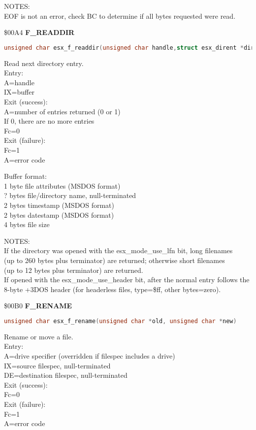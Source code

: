 NOTES:\\
EOF is not an error, check BC to determine if all bytes requested were read.

\$00A4 \textbf{F\_READDIR}

\begin{lstlisting}[language=C]
unsigned char esx_f_readdir(unsigned char handle,struct esx_dirent *dirent)
\end{lstlisting}

Read next directory entry.\\
Entry:\\
A=handle\\
IX=buffer\\
Exit (success):\\
A=number of entries returned (0 or 1)\\
If 0, there are no more entries\\
Fc=0\\
Exit (failure):\\
Fc=1\\
A=error code

Buffer format:\\
1 byte file attributes (MSDOS format)\\
? bytes file/directory name, null-terminated\\
2 bytes timestamp (MSDOS format)\\
2 bytes datestamp (MSDOS format)\\
4 bytes file size

NOTES:\\
If the directory was opened with the esx\_mode\_use\_lfn bit, long filenames\\
(up to 260 bytes plus terminator) are returned; otherwise short filenames\\
(up to 12 bytes plus terminator) are returned.\\
If opened with the esx\_mode\_use\_header bit, after the normal entry follows the\\
8-byte +3DOS header (for headerless files, type=\$ff, other bytes=zero).

\$00B0 \textbf{F\_RENAME}

\begin{lstlisting}[language=C]
unsigned char esx_f_rename(unsigned char *old, unsigned char *new)
\end{lstlisting}

Rename or move a file.\\
Entry:\\
A=drive specifier (overridden if filespec includes a drive)\\
IX=source filespec, null-terminated\\
DE=destination filespec, null-terminated\\
Exit (success):\\
Fc=0\\
Exit (failure):\\
Fc=1\\
A=error code

